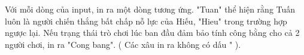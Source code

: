 Với mỗi dòng của input, in ra một dòng tương ứng. "Tuan" thể hiện rằng Tuấn luôn là người chiến thắng bất chấp nỗ lực của Hiếu, "Hieu" trong trường hợp ngược lại. Nếu trạng thái trò chơi lúc ban đầu đảm bảo tính công bằng cho cả 2 người chơi, in ra "Cong bang". ( Các xâu in ra không có dấu " ).